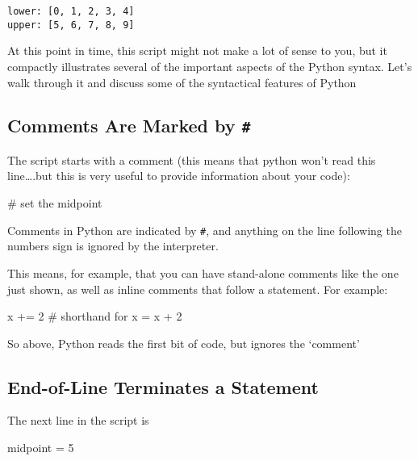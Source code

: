 \documentclass[
  letterpaper,
  DIV=11,
  numbers=noendperiod]{scrartcl}
\newenvironment{Shaded}{\begin{snugshade}}{\end{snugshade}}
\newcommand{\CommentTok}[1]{\textcolor[rgb]{0.37,0.37,0.37}{#1}}
\newcommand{\DecValTok}[1]{\textcolor[rgb]{0.68,0.00,0.00}{#1}}
\newcommand{\NormalTok}[1]{\textcolor[rgb]{0.00,0.23,0.31}{#1}}
\newcommand{\OperatorTok}[1]{\textcolor[rgb]{0.37,0.37,0.37}{#1}}
\begin{document}
\begin{verbatim}
lower: [0, 1, 2, 3, 4]
upper: [5, 6, 7, 8, 9]
\end{verbatim}

At this point in time, this script might not make a lot of sense to you,
but it compactly illustrates several of the important aspects of the
Python syntax. Let's walk through it and discuss some of the syntactical
features of Python

\hypertarget{comments-are-marked-by}{%
\subsection{\texorpdfstring{Comments Are Marked by
\texttt{\#}}{Comments Are Marked by \#}}\label{comments-are-marked-by}}

The script starts with a comment (this means that python won't read this
line\ldots.but this is very useful to provide information about your
code):

\begin{Shaded}
\begin{Highlighting}[]
\CommentTok{\# set the midpoint}
\end{Highlighting}
\end{Shaded}

Comments in Python are indicated by \texttt{\#}, and anything on the
line following the numbers sign is ignored by the interpreter.

This means, for example, that you can have stand-alone comments like the
one just shown, as well as inline comments that follow a statement. For
example:

\begin{Shaded}
\begin{Highlighting}[]
\NormalTok{x }\OperatorTok{+=} \DecValTok{2}  \CommentTok{\# shorthand for x = x + 2}
\end{Highlighting}
\end{Shaded}

So above, Python reads the first bit of code, but ignores the `comment'

\hypertarget{end-of-line-terminates-a-statement}{%
\subsection{End-of-Line Terminates a
Statement}\label{end-of-line-terminates-a-statement}}

The next line in the script is

\begin{Shaded}
\begin{Highlighting}[]
\NormalTok{midpoint }\OperatorTok{=} \DecValTok{5}
\end{Highlighting}
\end{Shaded}
\end{document}
